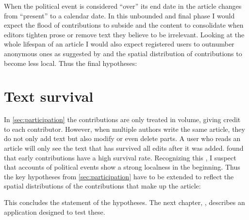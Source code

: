 When the political event is considered ``over'' its end date in the article changes from ``present'' to a calendar date.
In this unbounded and final phase I would expect the flood of contributions to subside and the content to consolidate when editors tighten prose or remove text they believe to be irrelevant.
Looking at the whole lifespan of an article I would also expect registered users to outnumber anonymous ones as suggested by \textcite{kittur2007power} and the spatial distribution of contributions to become less local.
Thus the final hypotheses:





\section{Text survival}\label{sec:textsurvival}

In \ref{sec:participation} the contributions are only treated in volume, giving credit to each contributor.
However, when multiple authors write the same article, they do not only add text but also modify or even delete parts.
A user who reads an article will only see the text that has survived all edits after it was added.
\textcite{viegas2004history} found that early contributions have a high survival rate.
Recognizing this , I suspect that accounts of political events show a strong localness in the beginning.
Thus the key hypotheses from \ref{sec:participation} have to be extended to reflect the spatial distributions of the contributions that make up the article:



This concludes the statement of the hypotheses.
The next chapter, , describes an application designed to test these.